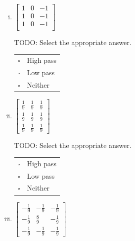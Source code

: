 \documentclass[11pt]{article}
\begin{document}
\begin{enumerate}[(a)]
\begin{enumerate}[(i)]
\item
 $\begin{bmatrix}
    1 & 0 & -1 \\
    1 & 0 & -1 \\
    1 & 0 & -1 \\
 \end{bmatrix}$
\begin{tcolorbox}[colback=white!5!white,colframe=green!75!black]
TODO: Select the appropriate answer. %

\begin{tabular}[h]{ll}
$\square$ & High pass \\
$\square$ & Low pass \\
$\square$ & Neither \\
\end{tabular}

\end{tcolorbox}

\item
 $\begin{bmatrix}
    \frac{1}{9} & \frac{1}{9} & \frac{1}{9} \\
    \frac{1}{9} & \frac{1}{9} & \frac{1}{9} \\
    \frac{1}{9} & \frac{1}{9} & \frac{1}{9}
 \end{bmatrix}$
 \begin{tcolorbox}[colback=white!5!white,colframe=green!75!black]

TODO: Select the appropriate answer. %

\begin{tabular}[h]{ll}
$\square$ & High pass \\
$\square$ & Low pass \\
$\square$ & Neither \\
\end{tabular}

\end{tcolorbox}

\item
$\begin{bmatrix}
    -\frac{1}{9} & -\frac{1}{9} & -\frac{1}{9} \\
    -\frac{1}{9} & \frac{8}{9} & -\frac{1}{9} \\
    -\frac{1}{9} & -\frac{1}{9} & -\frac{1}{9}
  \end{bmatrix}$
  \begin{tcolorbox}[colback=white!5!white,colframe=green!75!black]
  

\end{tcolorbox}
\end{enumerate}
\end{enumerate}
\end{document}
